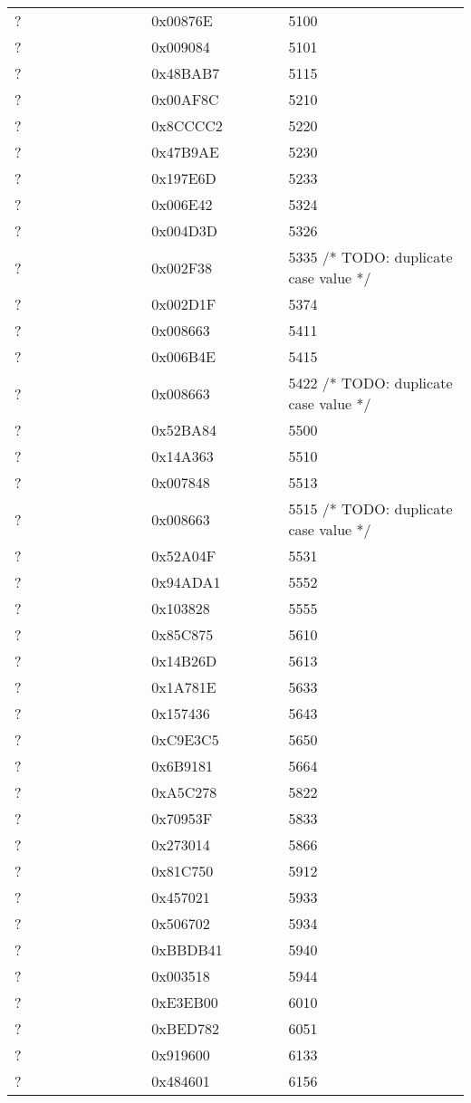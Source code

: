 \begin{longtable}{p{0.3\linewidth} p{0.3\linewidth} p{0.4\linewidth}}
? &  0x00876E &  5100\\
? &  0x009084 &  5101\\
? &  0x48BAB7 &  5115\\
? &  0x00AF8C &  5210\\
? &  0x8CCCC2 &  5220\\
? &  0x47B9AE &  5230\\
? &  0x197E6D &  5233\\
? &  0x006E42 &  5324\\
? &  0x004D3D &  5326\\
? &  0x002F38 &  5335 /* TODO: duplicate case value */\\
? &  0x002D1F &  5374\\
? &  0x008663 &  5411\\
? &  0x006B4E &  5415\\
? &  0x008663 &  5422 /* TODO: duplicate case value */\\
? &  0x52BA84 &  5500\\
? &  0x14A363 &  5510\\
? &  0x007848 &  5513\\
? &  0x008663 &  5515 /* TODO: duplicate case value */\\
? &  0x52A04F &  5531\\
? &  0x94ADA1 &  5552\\
? &  0x103828 &  5555\\
? &  0x85C875 &  5610\\
? &  0x14B26D &  5613\\
? &  0x1A781E &  5633\\
? &  0x157436 &  5643\\
? &  0xC9E3C5 &  5650\\
? &  0x6B9181 &  5664\\
? &  0xA5C278 &  5822\\
? &  0x70953F &  5833\\
? &  0x273014 &  5866\\
? &  0x81C750 &  5912\\
? &  0x457021 &  5933\\
? &  0x506702 &  5934\\
? &  0xBBDB41 &  5940\\
? &  0x003518 &  5944\\
? &  0xE3EB00 &  6010\\
? &  0xBED782 &  6051\\
? &  0x919600 &  6133\\
? &  0x484601 &  6156\\

\end{longtable}
